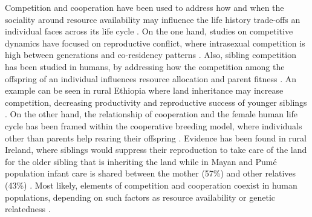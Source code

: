 \documentclass{article}
\begin{document}
Competition and cooperation have been used to address how and when the sociality around resource availability may influence the life history trade-offs an individual faces across its life cycle \citep{cant2008reproductive,kramer2005children}. On the one hand, studies on competitive dynamics have focused on reproductive conflict, where intrasexual competition is high between generations \citep{mace2012female,lahdenpera2012severe} and co-residency patterns \citep{pettay2016costly}. Also, sibling competition has been studied in humans, by addressing how the competition among the offspring of an individual influences resource allocation and parent fitness \citep{lawson2009trade}. An example can be seen in rural Ethiopia where land inheritance may increase competition, decreasing productivity and reproductive success of younger siblings \citep{gibson2011land}. On the other hand, the relationship of cooperation and the female human life cycle has been framed within the cooperative breeding model, where individuals other than parents help rearing their offspring \citep{hrdy2007evolutionary}. Evidence has been found in rural Ireland, where siblings would suppress their reproduction to take care of the land for the older sibling that is inheriting the land \citep{strassmann1998ecological} while in Mayan and Pumé population infant care is shared between the mother (57\%) and other relatives (43\%) \citep{kramer2018infant}. Most likely, elements of competition and cooperation coexist in human populations, depending on such factors as resource availability \citep{mulder2007hamilton} or genetic relatedness \citep{strassmann2011cooperation}. 
\\\\
\end{document}
